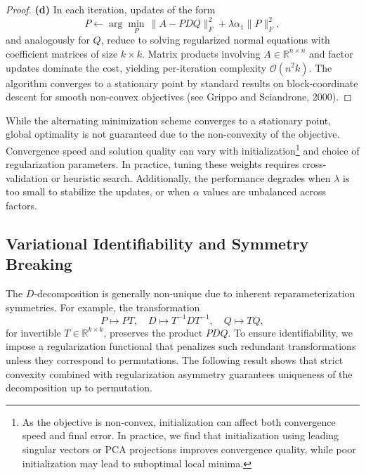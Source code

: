 \documentclass[10pt,a4paper]{article}
\begin{document}
\begin{proof}
\textbf{(d)} In each iteration, updates of the form
\[
P \leftarrow \arg\min_P \, \|A - P D Q\|_F^2 + \lambda \alpha_1 \|P\|_F^2,
\]
and analogously for \( Q \), reduce to solving regularized normal equations with coefficient matrices of size \( k \times k \). Matrix products involving \( A \in \mathbb{R}^{n \times n} \) and factor updates dominate the cost, yielding per-iteration complexity \( \mathcal{O}(n^2 k) \). The algorithm converges to a stationary point by standard results on block-coordinate descent for smooth non-convex objectives (see Grippo and Sciandrone, 2000).
\end{proof}While the alternating minimization scheme converges to a stationary point, global optimality is not guaranteed due to the non-convexity of the objective. Convergence speed and solution quality can vary with initialization\footnote{As the objective is non-convex, initialization can affect both convergence speed and final error. In practice, we find that initialization using leading singular vectors or PCA projections improves convergence quality, while poor initialization may lead to suboptimal local minima.} and choice of regularization parameters. In practice, tuning these weights requires cross-validation or heuristic search. Additionally, the performance degrades when \(\lambda\) is too small to stabilize the updates, or when \(\alpha\) values are unbalanced across factors.

\subsection{Variational Identifiability and Symmetry Breaking}

The $D$-decomposition is generally non-unique due to inherent reparameterization symmetries. For example, the transformation
\[
P \mapsto PT, \quad D \mapsto T^{-1} D T^{-1}, \quad Q \mapsto T Q,
\]
for invertible \( T \in \mathbb{R}^{k \times k} \), preserves the product \( P D Q \). To ensure identifiability, we impose a regularization functional that penalizes such redundant transformations unless they correspond to permutations. The following result shows that strict convexity combined with regularization asymmetry guarantees uniqueness of the decomposition up to permutation.
\end{document}

